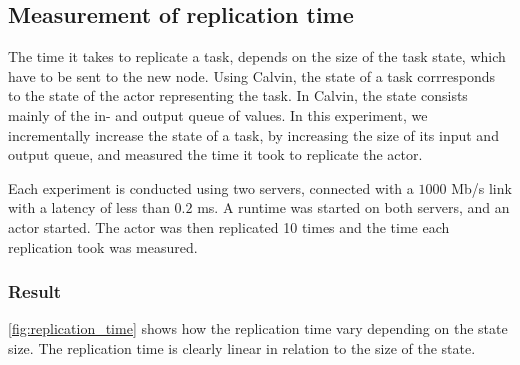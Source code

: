 \documentclass{cslthse-msc}
\begin{document}
\subsection{Measurement of replication time} \label{subsec:eval_repl_time}
The time it takes to replicate a task, depends on the size of the task state, which have to be sent to the new node. Using Calvin, the state of a task corrresponds to the state of the actor representing the task. In Calvin, the state consists mainly of the in- and output queue of values. In this experiment, we incrementally increase the state of a task, by increasing the size of its input and output queue, and measured the time it took to replicate the actor.

Each experiment is conducted using two servers, connected with a $1000$ Mb/s link with a latency of less than $0.2$ ms. A runtime was started on both servers, and an actor started. The actor was then replicated 10 times and the time each replication took was measured.

\subsubsection*{Result}
\autoref{fig:replication_time} shows how the replication time vary depending on the state size. The replication time is clearly linear in relation to the size of the state.
\end{document}
